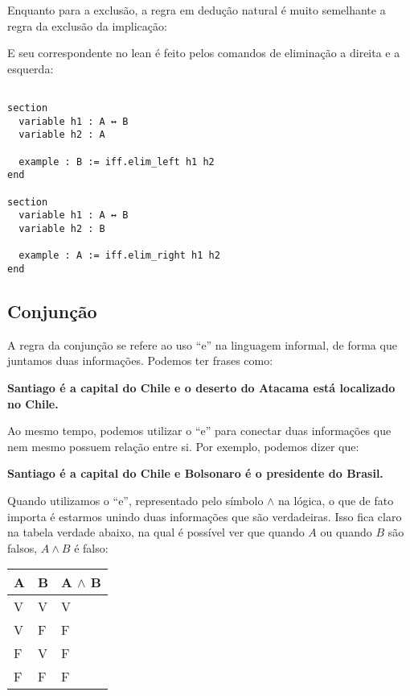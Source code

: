 Enquanto para a exclusão, a regra em dedução natural é muito semelhante a regra da exclusão da implicação:

\begin{prooftree}
\end{prooftree}
\begin{prooftree}
\end{prooftree}

E seu correspondente no lean é feito pelos comandos de eliminação a direita e a esquerda:

\vspace{5mm}
\begin{lstlisting} 

section
  variable h1 : A ↔ B
  variable h2 : A

  example : B := iff.elim_left h1 h2
end

section
  variable h1 : A ↔ B
  variable h2 : B

  example : A := iff.elim_right h1 h2
end

\end{lstlisting}
\vspace{5mm}


\subsection{Conjunção}
A regra da conjunção se refere ao uso ``e'' na linguagem informal, de forma que juntamos duas informações. Podemos ter frases como:
\begin{center}
\textbf{Santiago é a capital do Chile e o deserto do Atacama está localizado no Chile.}
\end{center}

Ao mesmo tempo, podemos utilizar o ``e'' para conectar duas informações que nem mesmo possuem relação entre si. Por exemplo, podemos dizer que:
\begin{center}
\textbf{Santiago é a capital do Chile e Bolsonaro é o presidente do Brasil.}
\end{center}
Quando utilizamos o ``e'', representado pelo símbolo $\land$ na lógica, o que de fato importa é estarmos unindo duas informações que são verdadeiras. Isso fica claro na tabela verdade abaixo, na qual é possível ver que quando $A$ ou quando $B$ são falsos, $A\land B$ é falso:

\begin{table}[htb]
\centering
\begin{tabular}{|l|l|l|}
\hline
\textbf{A} & \textbf{B} & \textbf{A $\land$ B} \\ \hline
V          & V          & V                  \\ \hline
V          & F          & F                  \\ \hline
F          & V          & F                  \\ \hline
F          & F          & F                  \\ \hline
\end{tabular}
\end{table}

